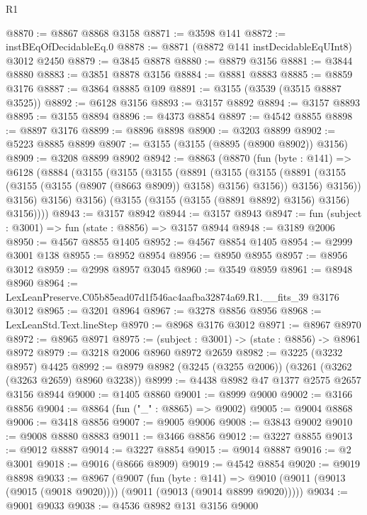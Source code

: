 \begin{lexlean}{R1}
\begin{coremodule}
@8870 := @8867 @8868 @3158
@8871 := @3598 @141
@8872 := instBEqOfDecidableEq.{0}
@8878 := @8871 (@8872 @141 instDecidableEqUInt8) @3012 @2450
@8879 := @3845 @8878
@8880 := @8879 @3156
@8881 := @3844 @8880
@8883 := @3851 @8878 @3156
@8884 := @8881 @8883
@8885 := @8859 @3176
@8887 := @3864 @8885 @109
@8891 := @3155 (@3539 (@3515 @8887 @3525))
@8892 := @6128 @3156
@8893 := @3157 @8892
@8894 := @3157 @8893
@8895 := @3155 @8894
@8896 := @4373 @8854
@8897 := @4542 @8855
@8898 := @8897 @3176
@8899 := @8896 @8898
@8900 := @3203 @8899
@8902 := @5223 @8885 @8899
@8907 := @3155 (@3155 (@8895 (@8900 @8902)) @3156)
@8909 := @3208 @8899 @8902
@8942 := @8863
    (@8870
      (fun (byte : @141) =>
      @6128
        (@8884
          (@3155
            (@3155
              (@3155
                (@8891
                  (@3155
                    (@3155
                      (@8891 (@3155 (@3155 (@3155 (@8907 (@8663 @8909)) @3158) @3156) @3156))
                      @3156)
                    @3156))
                @3156)
              @3156)
            @3156)
          (@3155 (@3155 (@3155 (@8891 @8892) @3156) @3156) @3156))))
@8943 := @3157 @8942
@8944 := @3157 @8943
@8947 := fun (subject : @3001) => fun (state : @8856) => @3157 @8944
@8948 := @3189 @2006
@8950 := @4567 @8855 @1405
@8952 := @4567 @8854 @1405
@8954 := @2999 @3001 @138
@8955 := @8952 @8954
@8956 := @8950 @8955
@8957 := @8956 @3012
@8959 := @2998 @8957 @3045
@8960 := @3549 @8959
@8961 := @8948 @8960
@8964 := LexLeanPreserve.C05b85ead07d1f546ac4aafba32874a69.R1.__fits_39 @3176 @3012
@8965 := @3201 @8964
@8967 := @3278 @8856 @8956
@8968 := LexLeanStd.Text.lineStep
@8970 := @8968 @3176 @3012
@8971 := @8967 @8970
@8972 := @8965 @8971
@8975 := (subject : @3001) -> (state : @8856) -> @8961 @8972
@8979 := @3218 @2006 @8960 @8972 @2659
@8982 := @3225 (@3232 @8957) @4425
@8992 := @8979 @8982 (@3245 (@3255 @2006)) (@3261 (@3262 (@3263 @2659) @8960 @3238))
@8999 := @4438 @8982 @47 @1377 @2575 @2657 @3156 @8944
@9000 := @1405 @8860
@9001 := @8999 @9000
@9002 := @3166 @8856
@9004 := @8864 (fun ("_" : @8865) => @9002)
@9005 := @9004 @8868
@9006 := @3418 @8856
@9007 := @9005 @9006
@9008 := @3843 @9002
@9010 := @9008 @8880 @8883
@9011 := @3466 @8856
@9012 := @3227 @8855
@9013 := @9012 @8887
@9014 := @3227 @8854
@9015 := @9014 @8887
@9016 := @2 @3001
@9018 := @9016 (@8666 @8909)
@9019 := @4542 @8854
@9020 := @9019 @8898
@9033 := @8967
    (@9007
      (fun (byte : @141) =>
      @9010 (@9011 (@9013 (@9015 (@9018 @9020)))) (@9011 (@9013 (@9014 @8899 @9020)))))
@9034 := @9001 @9033
@9038 := @4536 @8982 @131 @3156 @9000

\end{coremodule}
\end{lexlean}
